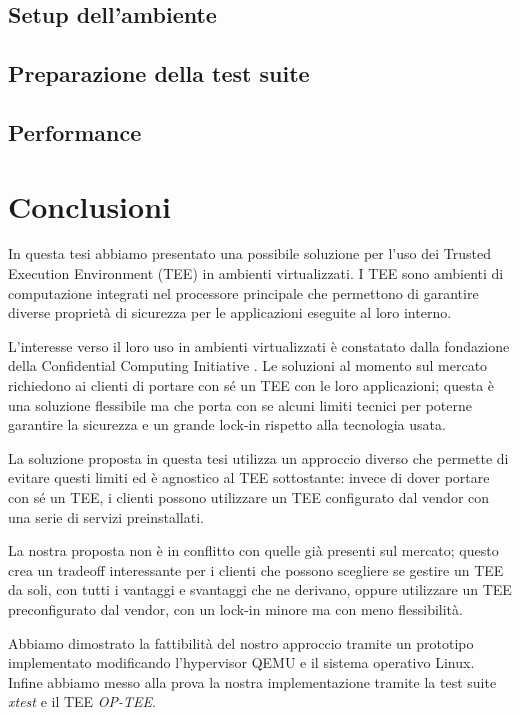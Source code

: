 \documentclass[12pt,italian]{report}
\begin{document}
\section{Setup dell'ambiente}
\label{sec:setup-ambiente}

\section{Preparazione della test suite}
\label{sec:preparazione-test-suite}

\section{Performance}
\label{sec:performance}

\chapter{Conclusioni}
\label{chap:conclusioni}
In questa tesi abbiamo presentato una possibile soluzione per l'uso dei
Trusted Execution Environment (TEE) in ambienti virtualizzati.
I TEE sono ambienti di computazione integrati nel processore principale
che permettono di garantire diverse proprietà di sicurezza per le
applicazioni eseguite al loro interno.

L'interesse verso il loro uso in ambienti virtualizzati è constatato dalla
fondazione della Confidential Computing Initiative
\cite{confidential-computing-initiative}.
Le soluzioni al momento sul mercato richiedono ai clienti di portare con sé
un TEE con le loro applicazioni; questa è una soluzione flessibile ma che
porta con se alcuni limiti tecnici per poterne garantire la sicurezza
e un grande lock-in rispetto alla tecnologia usata.

La soluzione proposta in questa tesi utilizza un approccio diverso che
permette di evitare questi limiti ed è agnostico al TEE sottostante:
invece di dover portare con sé un TEE, i clienti possono utilizzare un TEE
configurato dal vendor con una serie di servizi preinstallati.

La nostra proposta non è in conflitto con quelle già presenti sul mercato;
questo crea un tradeoff interessante per i clienti che possono scegliere
se gestire un TEE da soli, con tutti i vantaggi e svantaggi che ne derivano,
oppure utilizzare un TEE preconfigurato dal vendor, con un lock-in minore
ma con meno flessibilità.

Abbiamo dimostrato la fattibilità del nostro approccio tramite un prototipo
implementato modificando l'hypervisor QEMU e il sistema operativo Linux.
Infine abbiamo messo alla prova la nostra implementazione tramite la test
suite \textit{xtest} e il TEE \textit{OP-TEE}.
\end{document}
